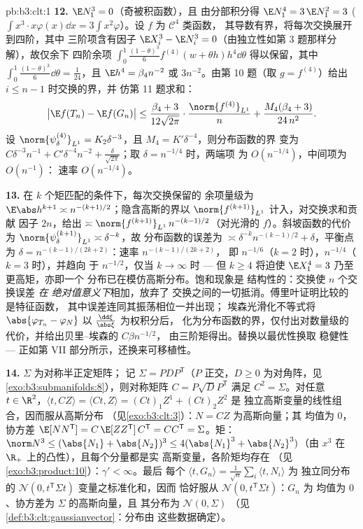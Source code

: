\begin{solution}{pb:b3:clt:1}
\textbf{12.} $\E N_1^3 = 0$（奇被积函数），且
由分部积分得 $\E N_1^4 = 3\,\E N_1^2 = 3$
($\int x^3\cdot x\varphi(x)\dd x =
3\int x^2\varphi$）。设 $f$ 为 $\mathcal C^4$ 类函数，
其导数有界，将每次交换展开到四阶，其中
三阶项含有因子 $\E X_i^3 - \E N_i^3 =
0$（由独立性如第 3 题那样分解），故仅余下
四阶余项
$\int_0^1\frac{(1-\theta)^3}6f^{(4)}(w + \theta
h)h^4\dd\theta$ 得以保留，其中 $\int_0^1
\frac{(1-\theta)^3}6\dd\theta = \frac1{24}$，且 $\E h^4 =
\beta_4n^{-2}$ 或 $3n^{-2}$。由第 10 题（取 $g =
f^{(4)}$）给出 $i \leq n - 1$ 时交换的界，并
仿第 11 题求和：
\[
\bigl|\E f(T_n) - \E f(G_n)\bigr| \leq
\frac{\beta_4 + 3}{12\sqrt{2\pi}}\cdot
\frac{\norm{f^{(4)}}_{L^1}}{n} +
\frac{M_4(\beta_4 + 3)}{24\,n^2} .
\]
设 $\norm{\psi_\delta^{(4)}}_{L^1} = K_2\delta^{-3}$，且
$M_4 = K'\delta^{-4}$，则分布函数的界
变为 $C\delta^{-3}n^{-1} + C'\delta^{-4}n^{-2} +
\frac\delta{\sqrt{2\pi}}$；取 $\delta = n^{-1/4}$ 时，两端项
为 $O(n^{-1/4})$，中间项为 $O(n^{-1})$：
速率 $O(n^{-1/4})$。

\textbf{13.} 在 $k$ 个矩匹配的条件下，每次交换保留的
余项量级为 $\E\abs h^{k+1} \asymp
n^{-(k+1)/2}$；隐含高斯的界以
$\norm{f^{(k+1)}}_{L^1}$ 计入，对交换求和贡献
因子 $2n$，给出 $\asymp\norm{f^{(k+1)}}_{L^1}\,
n^{-(k-1)/2}$（对光滑的 $f$）。斜坡函数的代价为
$\norm{\psi_\delta^{(k+1)}}_{L^1} \asymp \delta^{-k}$，故
分布函数的误差为 $\asymp
\delta^{-k}n^{-(k-1)/2} + \delta$，平衡点为 $\delta =
n^{-(k-1)/(2k+2)}$：速率 $n^{-(k-1)/(2k+2)}$，
即 $n^{-1/6}$（$k = 2$ 时），$n^{-1/4}$（$k = 3$ 时），并趋向
于 $n^{-1/2}$，仅当 $k \to \infty$ 时 --- 但 $k \geq 4$
将迫使 $\E X_1^4 = 3$ 乃至更高矩，亦即一个
分布已在模仿高斯分布。饱和现象是
结构性的：交换使 $n$ 个交换误差 \emph{在
绝对值意义下}相加，放弃了
交换之间的一切抵消。傅里叶证明比较的是特征函数，
其中误差连同其振荡相位一并出现；
埃森光滑化不等式将 $\abs{\varphi_{T_n}
- \varphi_N}$ 以 $\frac{\dd\xi}{\abs\xi}$ 为权积分后，
化为分布函数的界，仅付出对数量级的
代价，并给出贝里--埃森的 $C\beta n^{-1/2}$，
由三阶矩得出。替换以最优性换取
稳健性 --- 正如第 VII 部分所示，还换来可移植性。

\textbf{14.} $\Sigma$ 为对称半正定矩阵；
记 $\Sigma = PDP^{\mathsf T}$（$P$ 正交，$D \geq 0$
为对角阵，见\cref{exo:b3:submanifolds:8}），则对称矩阵 $C =
P\sqrt DP^{\mathsf T}$ 满足 $C^2 = \Sigma$。对任意 $t
\in \R^2$，$\langle t, CZ\rangle = \langle Ct, Z\rangle =
(Ct)_1Z^1 + (Ct)_2Z^2$ 是
独立高斯变量的线性组合，因而服从高斯分布
（见\cref{exo:b3:clt:3}）：$N = CZ$ 为高斯向量；其
均值为 $0$，协方差 $\E[NN^{\mathsf T}] =
C\,\E[ZZ^{\mathsf T}]\,C^{\mathsf T} = CC^{\mathsf T} =
\Sigma$。矩：$\norm N^3 \leq (\abs{N_1} +
\abs{N_2})^3 \leq 4(\abs{N_1}^3 + \abs{N_2}^3)$（由
$x^3$ 在 $\R_+$ 上的凸性），且每个分量都是实
高斯变量，各阶矩均存在
（见\cref{exo:b3:product:10}）：$\gamma' < \infty$。最后
每个 $\langle t, G_n\rangle = \frac1{\sqrt
n}\sum_i\langle t, N_i\rangle$ 为
独立同分布的 $\mathcal N(0, t^{\mathsf T}\Sigma t)$ 变量之标准化和，因而
恰好服从 $\mathcal N(0, t^{\mathsf T}\Sigma t)$：$G_n$ 为
均值为 $0$、协方差为 $\Sigma$ 的高斯向量，且
其分布为 $\mathcal N(0, \Sigma)$
（见\cref{def:b3:clt:gaussianvector}：分布由
这些数据确定）。


\end{solution}
